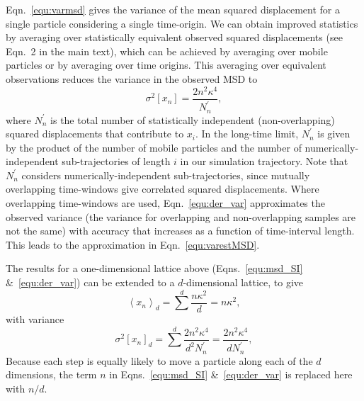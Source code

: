 \documentclass[reprint,superscriptaddress,nobibnotes,amsmath,amssymb,aps,prx,hidelinks,linenumbers]{revtex4-2}
\newcommand{\oMSDi}{\ensuremath{x_i}}
\newcommand{\oMSDn}{\ensuremath{x_n}}
\newcommand{\moMSDn}{\ensuremath{\left<\oMSDn\right>}}
\newcommand{\nind}[1]{\ensuremath{N^\prime_{#1}}}
\newcommand{\var}[1]{\ensuremath{\sigma^2[#1]}}
\begin{document}
Eqn.~\ref{equ:varmsd} gives the variance of the mean squared displacement for a single particle considering a single time-origin.
We can obtain improved statistics by averaging over statistically equivalent observed squared displacements (see Eqn.~2 in the main text), which can be achieved by averaging over mobile particles or by averaging over time origins.
This averaging over equivalent observations reduces the variance in the observed MSD to
\begin{equation}
    \var{\oMSDn} = \frac{2n^2\kappa^4}{\nind{n}},
\label{equ:der_var}
\end{equation}
where $\nind{n}$ is the total number of statistically independent (non-overlapping) squared displacements that contribute to $\oMSDi$.
In the long-time limit, $\nind{n}$ is given by the product of the number of mobile particles and the number of numerically-independent sub-trajectories of length $i$ in our simulation trajectory.
Note that $\nind{n}$ considers numerically-independent sub-trajectories, since mutually overlapping time-windows give correlated squared displacements.
Where overlapping time-windows are used, Eqn.~\ref{equ:der_var} approximates the observed variance (the variance for overlapping and non-overlapping samples are not the same) with accuracy that increases as a function of time-interval length. 
This leads to the approximation in Eqn.~\ref{equ:varestMSD}.

The results for a one-dimensional lattice above (Eqns.~\ref{equ:msd_SI} \&~\ref{equ:der_var}) can be extended to a $d$-dimensional lattice, to give
\begin{equation}
    \moMSDn_{d} = \sum^d{\frac{n\kappa^2}{d}} = n\kappa^2,
\end{equation}
with variance
\begin{equation}
    \var{\oMSDn}_d = \sum^d{\frac{2n^2\kappa^4}{d^2\nind{n}}} = \frac{2n^2\kappa^4}{d\nind{n}},
    \label{equ:analvar}
\end{equation}
Because each step is equally likely to move a particle along each of the $d$ dimensions, the term $n$ in Eqns.~\ref{equ:msd_SI} \&~\ref{equ:der_var} is replaced here with $n/d$.
\end{document}
